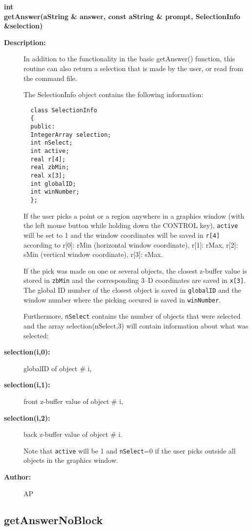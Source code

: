 \begin{flushleft} \textbf{%
int  \\ 
\settowidth{\GLGraphicsInterfaceIncludeArgIndent}{getAnswer(}%
getAnswer(aString \& answer, const aString \& prompt, SelectionInfo \&selection)
}\end{flushleft}
\begin{description}
\item[{\bf Description:}]  In addition to the functionality in the basic getAnswer() function,
  this routine can also return a selection that is made by the user, or read from the
  command file. 

  The SelectionInfo object contains the following information:
 \begin{verbatim}
  class SelectionInfo
  {
  public:
  IntegerArray selection;
  int nSelect;
  int active; 
  real r[4]; 
  real zbMin;
  real x[3];  
  int globalID;
  int winNumber;
  };
 \end{verbatim}
 If the user picks a point or a region anywhere in a graphics window (with the left mouse
 button while holding down the CONTROL key), {\tt active} will be set to 1 and the window 
 coordinates will be saved in {\tt r[4]} according to r[0]: rMin (horizontal window coordinate),
 r[1]: rMax, r[2]: sMin (vertical window coordinate), r[3]: sMax.

 If the pick was made on one or several objects, the closest z-buffer value is stored in
 {\tt zbMin} and the corresponding 3--D coordinates are saved in {\tt x[3]}. The global 
 ID number of the closest object is saved in {\tt globalID} and the window number where the 
 picking occured is saved in {\tt winNumber}.

 Furthermore, {\tt nSelect} contains
 the number of objects that were selected and the array selection(nSelect,3) will contain 
 information about what was selected: 

\item[{\bf selection(i,0):}]  globalID of object \# i, 
\item[{\bf selection(i,1):}]  front z-buffer value of object \# i,
\item[{\bf selection(i,2):}]  back z-buffer value of object \# i.

 Note that {\tt active} will be 1 and {\tt nSelect}=0 if the user picks outside all objects
 in the graphics window.

\item[{\bf Author:}]  AP
\end{description}
\subsection{getAnswerNoBlock}
 
